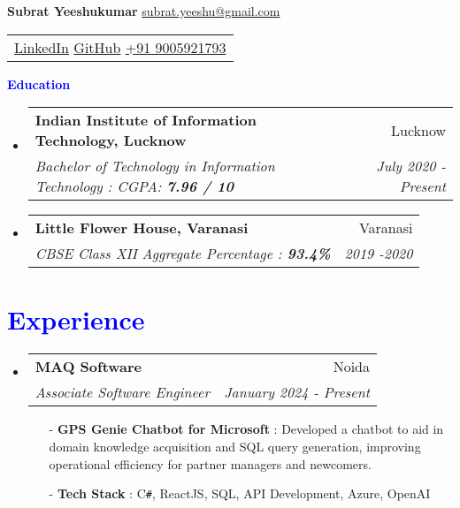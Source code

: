 \documentclass[letterpaper,11pt]{article}
\makeatletter
\newcommand{\resumeSubheading}[4]{
  \vspace{-1pt}\item
    \begin{tabular*}{0.97\textwidth}{l@{\extracolsep{\fill}}r}
      \textbf{#1} & #2 \\
      \textit{\small#3} & \textit{\small #4} \\
    \end{tabular*}\vspace{-5pt}
}
\newcommand{\resumeSubHeadingListStart}{\begin{itemize}[leftmargin=*]}
\newcommand{\resumeSubHeadingListEnd}{\end{itemize}}
\newcommand{\contactinfo}[4]{%
  \begin{tabular}{@{}l}
    \faLinkedinSquare\hspace{0.3em}\href{#1}{LinkedIn}  \faGithubSquare\hspace{0.3em}\href{#2}{GitHub} \hspace{11.55cm}
    \faPhoneSquare\hspace{0.5em} \href{tel:#3}{#3} \\
  \end{tabular}
}
\makeatother
\begin{document}
\textbf{\LARGE{Subrat Yeeshukumar}} \hspace{7.74cm} \faEnvelopeSquare \hspace{0.5em}\href{mailto:subrat.yeeshu@gmail.com}{subrat.yeeshu@gmail.com}\\
\vspace{3pt}
\contactinfo
  {https://www.linkedin.com/in/subrat-yeeshu}
  {https://github.com/SubratYeeshu}
  {+91 9005921793}




\section{\textbf{\textcolor{blue}{Education}}}
  \resumeSubHeadingListStart
    \resumeSubheading
      {Indian Institute of Information Technology, Lucknow}{Lucknow}
      {Bachelor of Technology in Information Technology : CGPA: \textbf{7.96 / 10}}{July 2020 - Present}
      \resumeSubheading{Little Flower House, Varanasi}{Varanasi}{CBSE Class XII Aggregate Percentage : \textbf{93.4\%}}{2019 -2020}
  \resumeSubHeadingListEnd


\section{\textbf{\textcolor{blue}{Experience}}}
  \resumeSubHeadingListStart
    \resumeSubheading
      {MAQ Software}{Noida}
      {Associate Software Engineer}{January 2024 - Present}
      \begin{itemize}
          \item[-] \textbf{GPS Genie Chatbot for Microsoft} : Developed a chatbot to aid in domain knowledge acquisition and SQL query generation, improving operational efficiency for partner managers and newcomers.
          \item[-]\textbf{Tech Stack} : C\verb|#|, ReactJS, SQL, API Development, Azure, OpenAI
          
      \end{itemize}

  \resumeSubHeadingListEnd

  
\end{document}

